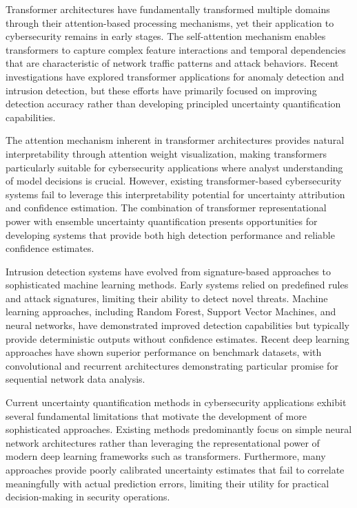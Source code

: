 \documentclass[journal]{IEEEtran}
\begin{document}
Transformer architectures have fundamentally transformed multiple domains through their attention-based processing mechanisms, yet their application to cybersecurity remains in early stages. The self-attention mechanism enables transformers to capture complex feature interactions and temporal dependencies that are characteristic of network traffic patterns and attack behaviors. Recent investigations have explored transformer applications for anomaly detection and intrusion detection, but these efforts have primarily focused on improving detection accuracy rather than developing principled uncertainty quantification capabilities.

The attention mechanism inherent in transformer architectures provides natural interpretability through attention weight visualization, making transformers particularly suitable for cybersecurity applications where analyst understanding of model decisions is crucial. However, existing transformer-based cybersecurity systems fail to leverage this interpretability potential for uncertainty attribution and confidence estimation. The combination of transformer representational power with ensemble uncertainty quantification presents opportunities for developing systems that provide both high detection performance and reliable confidence estimates.

Intrusion detection systems have evolved from signature-based approaches to sophisticated machine learning methods. Early systems relied on predefined rules and attack signatures, limiting their ability to detect novel threats. Machine learning approaches, including Random Forest, Support Vector Machines, and neural networks, have demonstrated improved detection capabilities but typically provide deterministic outputs without confidence estimates. Recent deep learning approaches have shown superior performance on benchmark datasets, with convolutional and recurrent architectures demonstrating particular promise for sequential network data analysis.

Current uncertainty quantification methods in cybersecurity applications exhibit several fundamental limitations that motivate the development of more sophisticated approaches. Existing methods predominantly focus on simple neural network architectures rather than leveraging the representational power of modern deep learning frameworks such as transformers. Furthermore, many approaches provide poorly calibrated uncertainty estimates that fail to correlate meaningfully with actual prediction errors, limiting their utility for practical decision-making in security operations.
\end{document}
